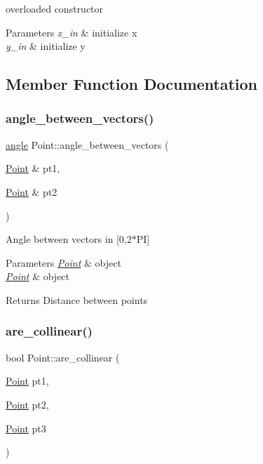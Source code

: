 overloaded constructor 
\begin{DoxyParams}{Parameters}
{\em x\+\_\+in} & initialize x \\
\hline
{\em y\+\_\+in} & initialize y \\
\hline
\end{DoxyParams}


\subsection{Member Function Documentation}
\mbox{\label{class_point_a188e0a4a3b9df9e76c749f2139ad0611}} 
\subsubsection{\texorpdfstring{angle\_between\_vectors()}{angle\_between\_vectors()}}
{\footnotesize\ttfamily \mbox{\hyperlink{primitives_8h_a41ee332ff1a31807cb838b616c186dd7}{angle}} Point\+::angle\+\_\+between\+\_\+vectors (\begin{DoxyParamCaption}\item[{\mbox{\hyperlink{class_point}{Point}} \&}]{pt1,  }\item[{\mbox{\hyperlink{class_point}{Point}} \&}]{pt2 }\end{DoxyParamCaption})\hspace{0.3cm}{\ttfamily [static]}}

Angle between vectors in \mbox{[}0,2$\ast$\+PI\mbox{]} 
\begin{DoxyParams}{Parameters}
{\em \mbox{\hyperlink{class_point}{Point}}} & object \\
\hline
{\em \mbox{\hyperlink{class_point}{Point}}} & object \\
\hline
\end{DoxyParams}
\begin{DoxyReturn}{Returns}
Distance between points 
\end{DoxyReturn}
\mbox{\label{class_point_a42bd18d21ff628166cc827871f7df960}} 
\subsubsection{\texorpdfstring{are\_collinear()}{are\_collinear()}}
{\footnotesize\ttfamily bool Point\+::are\+\_\+collinear (\begin{DoxyParamCaption}\item[{\mbox{\hyperlink{class_point}{Point}}}]{pt1,  }\item[{\mbox{\hyperlink{class_point}{Point}}}]{pt2,  }\item[{\mbox{\hyperlink{class_point}{Point}}}]{pt3 }\end{DoxyParamCaption})\hspace{0.3cm}{\ttfamily [static]}}


